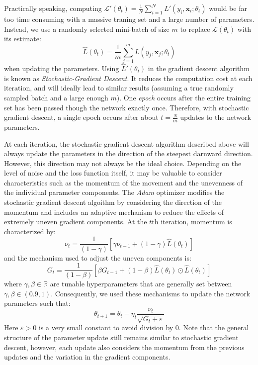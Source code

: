 \documentclass [MAS] {uclathes}
\begin{document}
Practically speaking, computing $\mathcal{L}'(\theta_t) = \frac{1}{N} \sum_{i=1}^{N} L'(y_i, \mathbf{x}_i; \theta_t)$ would be far too time consuming with a massive traning set and a large number of parameters. Instead, we use a randomly selected mini-batch of size $m$ to replace $\mathcal{L}(\theta_t)$ with its estimate: $$\hat{L}(\theta_t) = \frac{1}{m} \sum_{j=1}^{m} L(y_j, \mathbf{x}_j; \theta_t)$$ when updating the parameters. Using $\hat{L}'(\theta_t)$ in the gradient descent algorithm is known as \textit{Stochastic-Gradient Descent}. It reduces the computation cost at each iteration, and will ideally lead to similar results (assuming a true randomly sampled batch and a large enough $m$). One \textit{epoch} occurs after the entire training set has been passed though the network exactly once. Therefore, with stochastic gradient descent, a single epoch occurs after about $t=\frac{N}{m}$ updates to the network parameters.

At each iteration, the stochastic gradient descent algorithm described above will always update the parameters in the direction of the steepest darnward direction. However, this direction may not always be the ideal choice. Depending on the level of noise and the loss function itself, it may be valuable to consider characteristics such as the momentum of the movement and the unevenness of the individual parameter components. The \textit{Adam} optimizer modifies the stochastic gradient descent algoithm by considering the direction of the momentum and includes an adaptive mechanism to reduce the effects of extremely uneven gradient components. At the $t$th iteration, momentum is characterized by: $$\nu_t = \frac{1}{(1-\gamma)} \left[ \gamma \nu_{t-1} + (1-\gamma)\hat{L}(\theta_t) \right]$$ and the mechanism used to adjust the uneven components is: $$G_t = \frac{1}{(1-\beta)} \left[ \beta G_{t-1} + (1-\beta)\hat{L}(\theta_t) \odot \hat{L}(\theta_t)\right]$$ where $\gamma, \beta \in \mathbb{R}$ are tunable hyperparameters that are generally set between $\gamma, \beta \in (0.9, 1)$. Consequently, we used these mechanisms to update the network parameters such that: $$\theta_{t+1} = \theta_{t} - \eta_t \frac{\nu_t}{\sqrt{G_t + \varepsilon}}$$ Here $\varepsilon>0$ is a very small constant to avoid division by 0. Note that the general structure of the parameter update still remains similar to stochastic gradient descent, however, each update also considers the momentum from the previous updates and the variation in the gradient components.
\end{document}

